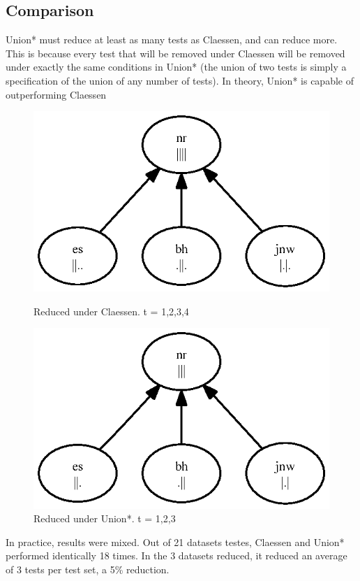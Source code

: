 \documentclass[11pt,twoside]{article}
\theoremstyle{definition}
\begin{document}
\subsection{Comparison}
Union* must reduce at least as many tests as Claessen, and can reduce more. This is because every test that will be removed under Claessen will be removed under exactly the same conditions in Union* (the union of two tests is simply a specification of the union of any number of tests). In theory, Union* is capable of outperforming Claessen

\begin{figure}

\includegraphics{toy.ps}
\caption{Reduced under Claessen. t = {1,2,3,4}}
\includegraphics{toyb.ps}
\caption{Reduced under Union*. t = {1,2,3}}
\end{figure}


In practice, results were mixed. Out of 21 datasets testes, Claessen and Union* performed identically 18 times. In the 3 datasets reduced, it reduced an average of 3 tests per test set, a 5\% reduction.
\end{document}
